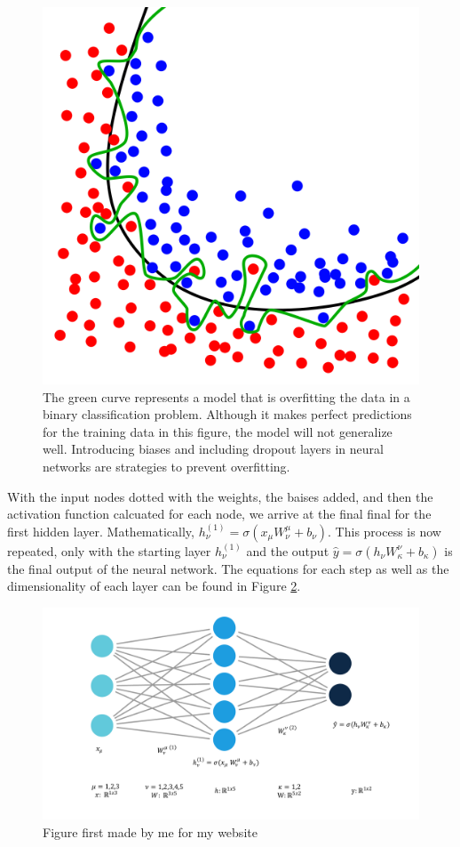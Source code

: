 \begin{figure}
    \centering
    \includegraphics[width=.5\linewidth]{Chapters/Figures/overfitting.png}
    \caption[Overfitting]{The green curve represents a model that is overfitting the data in a binary classification problem. Although it makes perfect predictions for the training data in this figure, the model will not generalize well. Introducing biases and including dropout layers in neural networks are strategies to prevent overfitting.}
    \label{fig:overfitting}
\end{figure}


With the input nodes dotted with the weights, the baises added, and then the activation function calcuated for each node, we arrive at the final final for the first hidden layer. Mathematically, $ h_\nu^{(1)} = \sigma\left( x_\mu W_\nu ^\mu + b_\nu \right) $. This process is now repeated, only with the starting layer $ h_\nu^{(1)} $ and the output
$ \hat{y} = \sigma \left( h_\nu W_\kappa ^\nu + b_\kappa \right)$ is the final output of the neural network. The equations for each step as well as the dimensionality of each layer can be found in Figure \ref{fig:simpleNN}.

\begin{figure}[h!]
    \centering
    \includegraphics[width=\linewidth]{Chapters/Figures/einstein_NN.pdf}
    \caption[Neural Network Example]{Figure first made by me for my website}
    \label{fig:simpleNN}
\end{figure}

